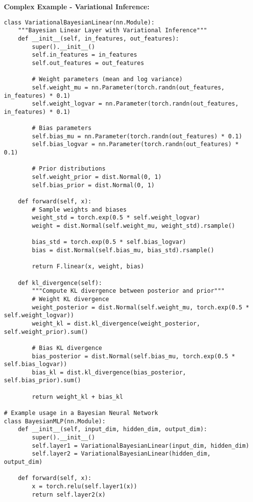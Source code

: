 \documentclass[11pt,a4paper]{book}
\begin{document}
\textbf{Complex Example - Variational Inference:}
\begin{verbatim}
class VariationalBayesianLinear(nn.Module):
    """Bayesian Linear Layer with Variational Inference"""
    def __init__(self, in_features, out_features):
        super().__init__()
        self.in_features = in_features
        self.out_features = out_features
        
        # Weight parameters (mean and log variance)
        self.weight_mu = nn.Parameter(torch.randn(out_features, in_features) * 0.1)
        self.weight_logvar = nn.Parameter(torch.randn(out_features, in_features) * 0.1)
        
        # Bias parameters
        self.bias_mu = nn.Parameter(torch.randn(out_features) * 0.1)
        self.bias_logvar = nn.Parameter(torch.randn(out_features) * 0.1)
        
        # Prior distributions
        self.weight_prior = dist.Normal(0, 1)
        self.bias_prior = dist.Normal(0, 1)
    
    def forward(self, x):
        # Sample weights and biases
        weight_std = torch.exp(0.5 * self.weight_logvar)
        weight = dist.Normal(self.weight_mu, weight_std).rsample()
        
        bias_std = torch.exp(0.5 * self.bias_logvar)
        bias = dist.Normal(self.bias_mu, bias_std).rsample()
        
        return F.linear(x, weight, bias)
    
    def kl_divergence(self):
        """Compute KL divergence between posterior and prior"""
        # Weight KL divergence
        weight_posterior = dist.Normal(self.weight_mu, torch.exp(0.5 * self.weight_logvar))
        weight_kl = dist.kl_divergence(weight_posterior, self.weight_prior).sum()
        
        # Bias KL divergence
        bias_posterior = dist.Normal(self.bias_mu, torch.exp(0.5 * self.bias_logvar))
        bias_kl = dist.kl_divergence(bias_posterior, self.bias_prior).sum()
        
        return weight_kl + bias_kl

# Example usage in a Bayesian Neural Network
class BayesianMLP(nn.Module):
    def __init__(self, input_dim, hidden_dim, output_dim):
        super().__init__()
        self.layer1 = VariationalBayesianLinear(input_dim, hidden_dim)
        self.layer2 = VariationalBayesianLinear(hidden_dim, output_dim)
    
    def forward(self, x):
        x = torch.relu(self.layer1(x))
        return self.layer2(x)
    

\end{verbatim}
\end{document}
